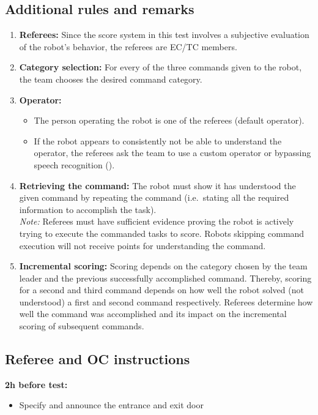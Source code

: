 \subsection{Additional rules and remarks}
\label{sec:gpsr_remarks}
\begin{enumerate}
	\item \textbf{Referees:} Since the score system in this test involves a subjective evaluation of the robot's behavior, the referees are EC/TC members.

	\item \textbf{Category selection:} For every of the three commands given to the robot, the team chooses the desired command category.

	\item \textbf{Operator:}
	\begin{itemize}
		\item The person operating the robot is one of the referees (default operator).
		\item If the robot appears to consistently not be able to understand the operator, the referees ask the team to use a custom operator or bypassing speech recognition ().
	\end{itemize}

	\item \textbf{Retrieving the command:} The robot must show it has understood the given command by repeating the command (i.e.~stating all the required information to accomplish the task).
	\\
	\textit{Note:} Referees must have sufficient evidence proving the robot is actively trying to execute the commanded tasks to score. Robots skipping command execution will not receive points for understanding the command.

	\item \textbf{Incremental scoring:} Scoring depends on the category chosen by the team leader and the previous successfully accomplished command. Thereby, scoring for a second and third command depends on how well the robot solved (not understood) a first and second command respectively. Referees determine how well the command was accomplished and its impact on the incremental scoring of subsequent commands.
\end{enumerate}

\subsection{Referee and OC instructions}
\textbf{2h before test:}
\begin{itemize}
	\item Specify and announce the entrance and exit door
\end{itemize}

